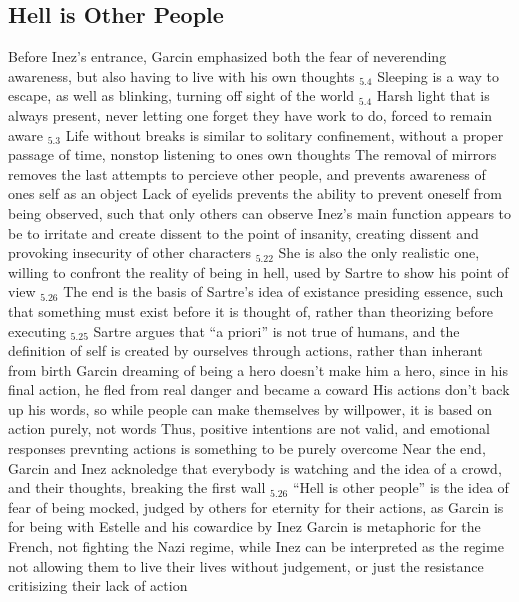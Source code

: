 \documentclass[11 pt, twoside]{article}
\newenvironment{outline*}
{
	\begin{outline}[enumerate]
	}
	{\end{outline}
}
\newcommand{\footb}[2]{\hyperlink{#1}{$_{#1.#2}$}}
\begin{document}
\subsection{Hell is Other People}
\begin{outline*}
\1 Before Inez's entrance, Garcin emphasized both the fear of neverending awareness, but also having to live with his own thoughts \footb{5}{4}
\2 Sleeping is a way to escape, as well as blinking, turning off sight of the world \footb{5}{4}
\2 Harsh light that is always present, never letting one forget they have work to do, forced to remain aware \footb{5}{3}
\1 Life without breaks is similar to solitary confinement, without a proper passage of time, nonstop listening to ones own thoughts
\2 The removal of mirrors removes the last attempts to percieve other people, and prevents awareness of ones self as an object
\2 Lack of eyelids prevents the ability to prevent oneself from being observed, such that only others can observe
\1 Inez's main function appears to be to irritate and create dissent to the point of insanity, creating dissent and provoking insecurity of other characters \footb{5}{22}
\2 She is also the only realistic one, willing to confront the reality of being in hell, used by Sartre to show his point of view  \footb{5}{26}
\1 The end is the basis of Sartre's idea of existance presiding essence, such that something must exist before it is thought of, rather than theorizing before executing \footb{5}{25}
\2 Sartre argues that ``a priori'' is not true of humans, and the definition of self is created by ourselves through actions, rather than inherant from birth
\2 Garcin dreaming of being a hero doesn't make him a hero, since in his final action, he fled from real danger and became a coward
\2 His actions don't back up his words, so while people can make themselves by willpower, it is based on action purely, not words
\2 Thus, positive intentions are not valid, and emotional responses prevnting actions is something to be purely overcome
\1 Near the end, Garcin and Inez acknoledge that everybody is watching and the idea of a crowd, and their thoughts, breaking the first wall \footb{5}{26}
\2 ``Hell is other people'' is the idea of fear of being mocked, judged by others for eternity for their actions, as Garcin is for being with Estelle and his cowardice by Inez
\2 Garcin is metaphoric for the French, not fighting the Nazi regime, while Inez can be interpreted as the regime not allowing them to live their lives without judgement, or just the resistance critisizing their lack of action
\end{outline*}
\end{document}
